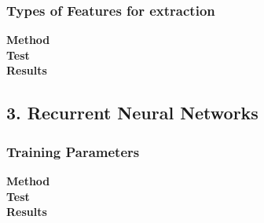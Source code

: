 \documentclass[../main.tex]{subfiles}
\begin{document}
\subsubsection{Types of Features for extraction}
\textbf{Method}\\
\textbf{Test}\\
\textbf{Results}\\

\subsection{3. Recurrent Neural Networks}

\subsubsection{Training Parameters}
\textbf{Method}\\
\textbf{Test}\\
\textbf{Results}\\







\end{document}
